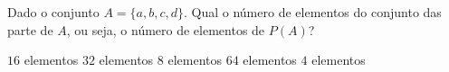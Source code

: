 \noindent\parbox{\linewidth}{
	
Dado o conjunto $A=\{a,b,c,d\}$. Qual o número de elementos do conjunto das parte de $A$, ou seja, o número de elementos de $P(A)$?

$16$ elementos
$32$ elementos
$8$ elementos
$64$ elementos
$4$ elementos




}



